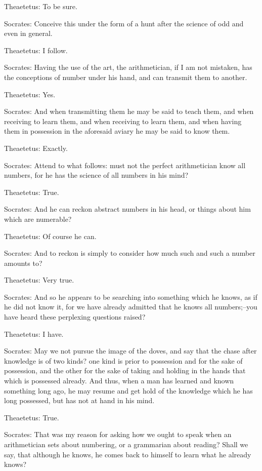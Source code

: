 Theaetetus: To be sure.

Socrates: Conceive this under the form of a hunt after the science of
odd and even in general.

Theaetetus: I follow.

Socrates: Having the use of the art, the arithmetician, if I am not
mistaken, has the conceptions of number under his hand, and can transmit
them to another.

Theaetetus: Yes.

Socrates: And when transmitting them he may be said to teach them, and
when receiving to learn them, and when receiving to learn them, and when
having them in possession in the aforesaid aviary he may be said to know
them.

Theaetetus: Exactly.

Socrates: Attend to what follows: must not the perfect arithmetician
know all numbers, for he has the science of all numbers in his mind?

Theaetetus: True.

Socrates: And he can reckon abstract numbers in his head, or things
about him which are numerable?

Theaetetus: Of course he can.

Socrates: And to reckon is simply to consider how much such and such a
number amounts to?

Theaetetus: Very true.

Socrates: And so he appears to be searching into something which he
knows, as if he did not know it, for we have already admitted that he
knows all numbers;--you have heard these perplexing questions raised?

Theaetetus: I have.

Socrates: May we not pursue the image of the doves, and say that the
chase after knowledge is of two kinds? one kind is prior to possession
and for the sake of possession, and the other for the sake of taking and
holding in the hands that which is possessed already. And thus, when a
man has learned and known something long ago, he may resume and get hold
of the knowledge which he has long possessed, but has not at hand in his
mind.

Theaetetus: True.

Socrates: That was my reason for asking how we ought to speak when an
arithmetician sets about numbering, or a grammarian about reading? Shall
we say, that although he knows, he comes back to himself to learn what
he already knows?

